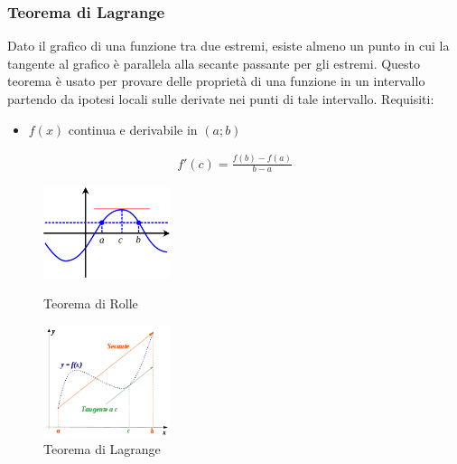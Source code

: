 \documentclass[a4paper]{article}
\begin{document}
	\subsubsection{Teorema di Lagrange}
	Dato il grafico di una funzione tra due estremi, esiste almeno un punto in cui la tangente al grafico è parallela alla secante passante per gli estremi.
	Questo teorema è usato per provare delle proprietà di una funzione in un intervallo partendo da ipotesi locali sulle derivate nei punti di tale intervallo.
	Requisiti:
	\begin{itemize}
		\item $f(x)$ continua e derivabile in $(a;b)$
	\end{itemize}
	\begin{align*}
	f'(c)= \frac{f(b)-f(a)}{b-a}
	\end{align*}
	\begin{center}
	\begin{figure}[htpb]
		\begin{minipage}[H]{0.47\textwidth}
			\centering
			\includegraphics[width=3.7cm]{rolle.png}
			\caption{\label{f_etichetta1}Teorema di Rolle}
		\end{minipage}
		\hfill
		\begin{minipage}[H]{0.47\textwidth}
			\centering
			\includegraphics[width=3.7cm]{lagrange.png}
			\caption{\label{f_etichetta1}Teorema di Lagrange}
		\end{minipage}
	\end{figure}
		
	\end{center}
	
	\newpage
\end{document}
